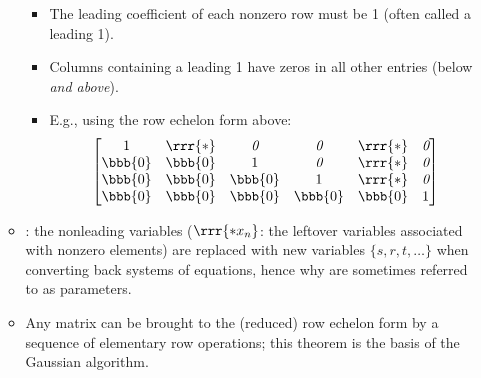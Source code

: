 \begin{itemize}
\begin{itemize}
    \begin{itemize}
      \item The leading coefficient of each nonzero row must be 1 (often called a leading 1). 
      \item Columns containing a leading 1 have zeros in all other entries (below \emph{and above}).
      \item E.g., using the row echelon form above:
      \[%
      \begin{bmatrix}
        1 & \rrr{*} & \emph{0} & \emph{0} & \rrr{*} & \emph{0} \\
        \bbb{0} & \bbb{0} & 1 & \emph{0} & \rrr{*} & \emph{0} \\
        \bbb{0} & \bbb{0} & \bbb{0} & 1 & \rrr{*} & \emph{0} \\
        \bbb{0} & \bbb{0} & \bbb{0} & \bbb{0} & \bbb{0} & 1 \\
      \end{bmatrix}
      \]%
    \end{itemize}
    \item {}: the nonleading variables (\(\rrr{*x_n}\): the leftover variables associated with nonzero elements) are replaced with new variables \(\{s,r,t,\dots\}\) when converting back systems of equations, hence why \hyperref[Linear Equations]{} are sometimes referred to as parameters. %
    \item Any matrix can be brought to the (reduced) row echelon form by a sequence of elementary row operations; this theorem is the basis of the Gaussian algorithm. 
  \end{itemize}
  

\end{itemize}
